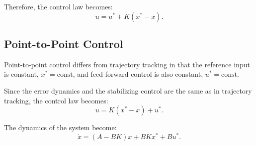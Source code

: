 Therefore, the control law becomes:
\[u = u^* + K(x^* - x).\]

\subsection{Point-to-Point Control}

Point-to-point control differs from trajectory tracking in that the reference input is constant, \(x^* = \text{const}\), and feed-forward control is also constant, \(u^* = \text{const}\).

Since the error dynamics and the stabilizing control are the same as in trajectory tracking, the control law becomes:
\[u = K(x^* - x) + u^*.\]

The dynamics of the system become:
\[\dot{x} = (A - BK)x + BKx^* + Bu^*.\]